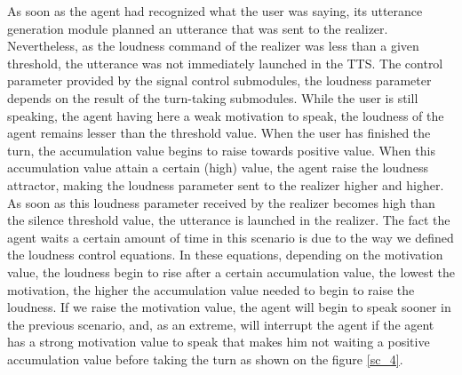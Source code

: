 
As soon as the agent had recognized what the user was saying, its utterance generation module planned an utterance that was sent to the realizer. Nevertheless, as the loudness command of the realizer was less than a given threshold, the utterance was not immediately launched in the TTS. 
The control parameter provided by the signal control submodules, the loudness parameter depends on the result of the turn-taking submodules. While the user is still speaking, the agent having here a weak motivation to speak, the loudness of the agent remains lesser than the threshold value. When the user has finished the turn, the accumulation value begins to raise towards positive value. When this accumulation value attain a certain (high) value, the agent raise the loudness attractor, making the loudness parameter sent to the realizer higher and higher. As soon as this loudness parameter received by the realizer becomes high than the silence threshold value, the utterance is launched in the realizer.
The fact the agent waits a certain amount of time in this scenario is due to the way we defined the loudness control equations. In these equations, depending on the motivation value, the loudness begin to rise after a certain accumulation value, the lowest the motivation, the higher the accumulation value needed to begin to raise the loudness. If we raise the motivation value, the agent will begin to speak sooner in the previous scenario, and, as an extreme, will interrupt the agent if the agent has a strong motivation value to speak that makes him not waiting a positive accumulation value before taking the turn as shown on the figure \ref{sc_4}. 
